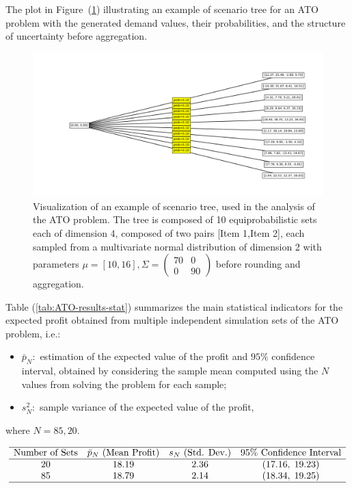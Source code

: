\documentclass[a4paper,12pt]{article}
\begin{document}
	
	
	\newpage
	\noindent The plot in Figure~(\ref{fig:ato-scenariotree}) illustrating an example of scenario tree for an ATO problem  with the generated demand values, their probabilities, and the structure of uncertainty before aggregation.
	
	\begin{figure}[H]
		\centering
		\includegraphics[width=1\textwidth]{../immagini/scenariATO.png}
		\caption{Visualization of an example of scenario tree, used in the analysis of the ATO problem. The tree is composed of 10 equiprobabilistic sets each of dimension 4, composed of two pairs [Item 1,Item 2], each sampled from a multivariate normal distribution of dimension 2 with parameters $\mu = [10,16], \Sigma = \begin{pmatrix} 70 &0  \\ 0 &90  \end{pmatrix}$ before rounding and aggregation.}
		\label{fig:ato-scenariotree}
	\end{figure}
	
	\noindent
	Table (\ref{tab:ATO-results-stat}) summarizes the main statistical indicators for the expected profit obtained from multiple independent simulation sets of the ATO problem, i.e.: 
	\begin{itemize}
		\item $\bar{p}_{N}:$ estimation of the expected value of the profit and $95\%$ confidence interval, obtained by considering the sample mean computed using the $N$ values from solving the problem for each sample; 
		\item $s^{2}_{N}:$ sample variance of the expected value of the profit,
	\end{itemize}
	
	\noindent where $N = 85, 20.$

	\[
	\begin{array}{cccc}
		\hline
		\text{Number of Sets} & \text{$\bar{p}_{N}$ (Mean Profit)} & \text{$s_{N}$ (Std. Dev.)} & \text{95\% Confidence Interval} \\
		\hline
		20 & 18.19 & 2.36 & (17.16,\; 19.23) \\
		85 & 18.79 & 2.14 & (18.34,\; 19.25) \\
		\hline
	\end{array}
	\]
	\label{tab:ATO-results-stat}
	
\end{document}
